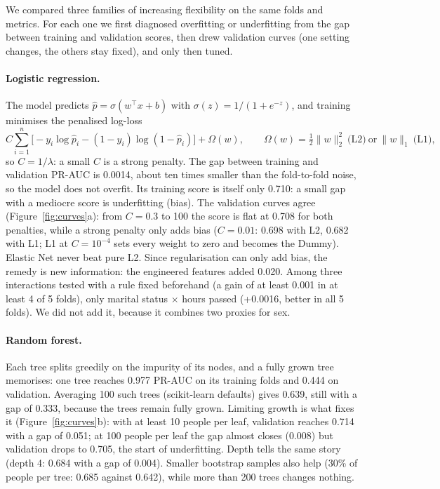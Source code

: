 \documentclass[11pt,a4paper]{article}
\begin{document}
We compared three families of increasing flexibility on the same folds and metrics. For each one we first diagnosed overfitting or underfitting from the gap between training and validation scores, then drew validation curves (one setting changes, the others stay fixed), and only then tuned.

\paragraph{Logistic regression.} The model predicts $\hat p = \sigma(w^\top x + b)$ with $\sigma(z) = 1/(1+e^{-z})$, and training minimises the penalised log-loss
\begin{equation}
C \sum_{i=1}^{n} \Big[-y_i \log \hat p_i - (1-y_i)\log(1-\hat p_i)\Big] + \Omega(w), \qquad
\Omega(w) = \tfrac12\lVert w\rVert_2^2 \ \text{(L2)} \ \text{or}\ \lVert w\rVert_1 \ \text{(L1)},
\end{equation}
so $C = 1/\lambda$: a small $C$ is a strong penalty. The gap between training and validation PR-AUC is 0.0014, about ten times smaller than the fold-to-fold noise, so the model does not overfit. Its training score is itself only 0.710: a small gap with a mediocre score is underfitting (bias). The validation curves agree (Figure~\ref{fig:curves}a): from $C=0.3$ to 100 the score is flat at 0.708 for both penalties, while a strong penalty only adds bias ($C=0.01$: 0.698 with L2, 0.682 with L1; L1 at $C=10^{-4}$ sets every weight to zero and becomes the Dummy). Elastic Net never beat pure L2. Since regularisation can only add bias, the remedy is new information: the engineered features added 0.020. Among three interactions tested with a rule fixed beforehand (a gain of at least 0.001 in at least 4 of 5 folds), only marital status $\times$ hours passed (+0.0016, better in all 5 folds). We did not add it, because it combines two proxies for sex.

\paragraph{Random forest.} Each tree splits greedily on the impurity of its nodes, and a fully grown tree memorises: one tree reaches 0.977 PR-AUC on its training folds and 0.444 on validation. Averaging 100 such trees (scikit-learn defaults) gives 0.639, still with a gap of 0.333, because the trees remain fully grown. Limiting growth is what fixes it (Figure~\ref{fig:curves}b): with at least 10 people per leaf, validation reaches 0.714 with a gap of 0.051; at 100 people per leaf the gap almost closes (0.008) but validation drops to 0.705, the start of underfitting. Depth tells the same story (depth 4: 0.684 with a gap of 0.004). Smaller bootstrap samples also help (30\% of people per tree: 0.685 against 0.642), while more than 200 trees changes nothing.
\end{document}

